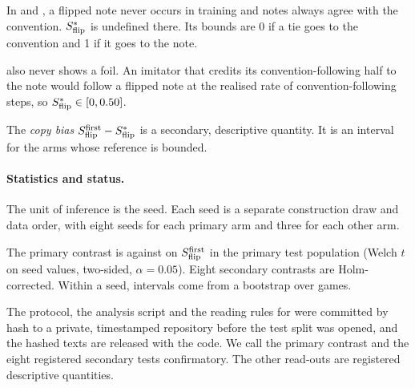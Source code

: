 In  and , a flipped note never occurs in training and notes always agree with the convention. $S_{\mathrm{flip}}^{*}$ is undefined there. Its bounds are 0 if a tie goes to the convention and 1 if it goes to the note.

 also never shows a foil. An imitator that credits its convention-following half to the note would follow a flipped note at the realised rate of convention-following steps, so $S_{\mathrm{flip}}^{*} \in [0, 0.50]$.

The \emph{copy bias} $S_{\mathrm{flip}}^{\mathrm{first}} - S_{\mathrm{flip}}^{*}$ is a secondary, descriptive quantity. It is an interval for the arms whose reference is bounded.

\paragraph{Statistics and status.}
The unit of inference is the seed. Each seed is a separate construction draw and data order, with eight seeds for each primary arm and three for each other arm.

The primary contrast is  against  on $S_{\mathrm{flip}}^{\mathrm{first}}$ in the primary test population (Welch $t$ on seed values, two-sided, $\alpha=0.05$). Eight secondary contrasts are Holm-corrected. Within a seed, intervals come from a bootstrap over games.

The protocol, the analysis script and the reading rules for  were committed by hash to a private, timestamped repository before the test split was opened, and the hashed texts are released with the code. We call the primary contrast and the eight registered secondary tests confirmatory. The other read-outs are registered descriptive quantities.
